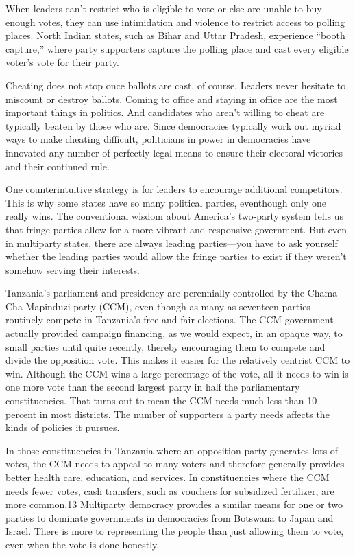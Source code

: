 \documentclass[10pt]{article}
\begin{document}
{\large When leaders can't restrict who is eligible to vote or else are unable
to buy enough votes, they can use intimidation and violence to restrict access to
polling places. North Indian states, such as Bihar and Uttar Pradesh, experience
``booth capture,'' where party supporters capture the polling place and cast
every eligible voter's vote for their party.}

{\large Cheating does not stop once ballots are cast, of course. Leaders never
hesitate to miscount or destroy ballots. Coming to office and staying in office
are the most important things in politics. And candidates who aren't willing to
cheat are typically beaten by those who are. Since democracies typically work out
myriad ways to make cheating difficult, politicians in power in democracies have
innovated any number of perfectly legal means to ensure their electoral victories
and their continued rule.}

{\large One counterintuitive strategy is for leaders to encourage additional
competitors. This is why some states have so many political parties, eventhough
only one really wins. The conventional wisdom about America's two-party system
tells us that fringe parties allow for a more vibrant and responsive government.
But even in multiparty states, there are always leading parties---you have to ask
yourself whether the leading parties would allow the fringe parties to exist if
they weren't somehow serving their interests.}

{\large Tanzania's parliament and presidency are perennially controlled by the
Chama Cha Mapinduzi party (CCM), even though as many as seventeen parties
routinely compete in Tanzania's free and fair elections. The CCM government
actually provided campaign financing, as we would expect, in an opaque way, to
small parties until quite recently, thereby encouraging them to compete and
divide the opposition vote. This makes it easier for the relatively centrist CCM
to win. Although the CCM wins a large percentage of the vote, all it needs to win
is one more vote than the second largest party in half the parliamentary
constituencies. That turns out to mean the CCM needs much less than 10 percent in
most districts. The number of supporters a party needs affects the kinds of
policies it pursues.}

{\large In those constituencies in Tanzania where an opposition party generates
lots of votes, the CCM needs to appeal to many voters and therefore generally
provides better health care, education, and services. In constituencies where the
CCM needs fewer votes, cash transfers, such as vouchers for subsidized
fertilizer, are more common.13 Multiparty democracy provides a similar means for
one or two parties to dominate governments in democracies from Botswana to Japan
and Israel. There is more to representing the people than just allowing them to
vote, even when the vote is done honestly.}
\end{document}
